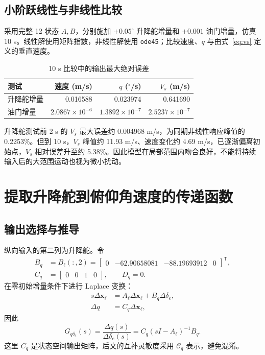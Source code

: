 \documentclass[UTF8,a4paper,11pt,fontset=windows]{ctexart}
\newcommand{\de}{\delta_e}
\newcommand{\Gq}{G_{q\delta_e}}
\begin{document}
\subsection{小阶跃线性与非线性比较}
采用完整 12 状态 $A,B$，分别施加 $+0.05^\circ$ 升降舵增量和 $+0.001$ 油门增量，仿真 10 s。线性解使用矩阵指数，非线性解使用 \texttt{ode45}；比较速度、$q$ 与由式~\eqref{eq:vs} 定义的垂直速度。
\begin{table}[H]\centering
\caption{10 s 比较中的输出最大绝对误差}
\begin{tabular}{lrrr}\toprule
测试&速度 (m/s)&$q$ ($^\circ$/s)&$V_s$ (m/s)\\\midrule
升降舵增量&0.016588&0.023974&0.641690\\
油门增量&$2.0867\times10^{-6}$&$1.3892\times10^{-7}$&$2.5237\times10^{-7}$\\\bottomrule
\end{tabular}
\end{table}
升降舵测试前 2 s 的 $V_s$ 最大误差约 0.004968 m/s，为同期非线性响应峰值的 0.2253\%。但到 10 s，$V_s$ 峰值约 11.93 m/s、速度变化约 4.69 m/s，已逐渐偏离初始点，$V_s$ 相对误差升至约 5.38\%。因此模型在局部范围内吻合良好，不能将持续输入后的大范围运动也视为微小扰动。

\section{提取升降舵到俯仰角速度的传递函数}
\subsection{输出选择与推导}
纵向输入的第二列为升降舵。令
\begin{equation}
\begin{aligned}
B_q&=B_\ell(:,2)=\begin{bmatrix}0&-62.90658081&-88.19693912&0\end{bmatrix}^{\mathsf T},\\
C_q&=\begin{bmatrix}0&0&1&0\end{bmatrix},\qquad D_q=0.
\end{aligned}
\end{equation}
在零初始增量条件下进行 Laplace 变换：
\begin{align}
s\Delta\bm x_\ell&=A_\ell\Delta\bm x_\ell+B_q\Delta\de,\\
\Delta q&=C_q\Delta\bm x_\ell,
\end{align}
因此
\begin{equation}\label{eq:gdefinition}
\boxed{\Gq(s)=\frac{\Delta q(s)}{\Delta\de(s)}=C_q(sI-A_\ell)^{-1}B_q.}
\end{equation}
这里 $C_q$ 是状态空间输出矩阵，后文的互补灵敏度采用 $\mathcal C_q$ 表示，避免混淆。
\end{document}
